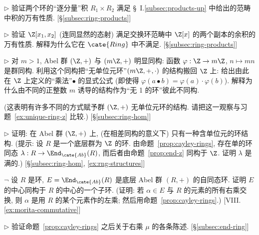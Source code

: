 \begin{prob}
\label{ex:ring-product}
$\triangleright$ 验证两个环的``逐分量''积 $R_1 \times R_2$ 满足 \S~I.\ref{subsec:products-up} 中给出的范畴中积的万有性质. [\S\ref{subsec:ring-products}]
\end{prob}

\begin{prob}
\label{ex:zx-coproduct}
$\triangleright$ 验证 $\Z[x_1, x_2]$ (连同显然的态射) 满足交换环范畴中 $\Z[x]$ 的两个副本的余积的万有性质. 解释为什么它在 $\cate{Ring}$ 中不满足. [\S\ref{subsec:ring-products}]
\end{prob}

\begin{prob}
\label{ex:rng-structures}
$\triangleright$ 对 $m > 1$, Abel 群 $(\Z, +)$ 与 $(m\Z, +)$ 明显同构: 函数 $\varphi : \Z \to m\Z$, $n \mapsto mn$ 是群同构. 利用这个同构把``无单位元环''$(m\Z, +, \cdot)$ 的结构搬回 $\Z$ 上: 给出由此在 $\Z$ 上定义的``乘法''$\bullet$ 的显式公式 (即使得 $\varphi(a \bullet b) = \varphi(a) \cdot \varphi(b)$). 解释为什么由不同的正整数 $m$ 诱导的结构作为``无 1 的环''彼此不同构.

(这表明有许多不同的方式赋予群 $(\Z, +)$ 无单位元环的结构. 请把这一观察与习题~\ref{ex:unique-ring-z} 比较.) [\S\ref{subsec:ring-hom}]
\end{prob}

\begin{prob}
\label{ex:unique-ring-z}
$\triangleright$ 证明: 在 Abel 群 $(\Z, +)$ 上, (在相差同构的意义下) 只有一种含单位元的环结构. (提示: 设 $R$ 是一个底层群为 $\Z$ 的环. 由命题~\ref{prop:cayley-rings}, 存在单的环同态 $\lambda : R \to \End_{\cate{Ab}}(R)$, 而后者由命题~\ref{prop:end-z} 同构于 $\Z$. 证明 $\lambda$ 是满的.) [\S\ref{subsec:ring-hom}, \ref{ex:rng-structures}]
\end{prob}

\begin{prob}
\label{ex:center-of-end}
$\neg$ 设 $R$ 是环, $E = \End_{\cate{Ab}}(R)$ 是底层 Abel 群 $(R, +)$ 的自同态环. 证明 $E$ 的中心同构于 $R$ 的中心的一个子环. (证明: 若 $\alpha \in E$ 与 $R$ 的元素的所有右乘交换, 则 $\alpha$ 是用 $R$ 的某个元素作的左乘; 然后用命题~\ref{prop:cayley-rings}.) [VIII.\ref{ex:morita-commutative}]
\end{prob}

\begin{prob}
\label{ex:right-mult}
$\triangleright$ 验证命题~\ref{prop:cayley-rings} 之后关于右乘 $\mu$ 的各条陈述. [\S\ref{subsec:end-ring}]
\end{prob}

